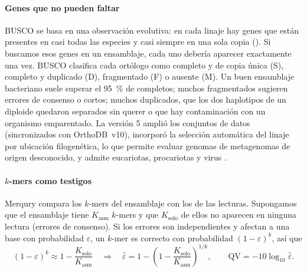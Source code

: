 \paragraph{Genes que no pueden faltar} BUSCO \parencite{c08-simao2015} se basa en una observación evolutiva: en cada linaje hay genes que están presentes en casi todas las especies y casi siempre en una sola copia (). Si buscamos esos genes en un ensamblaje, cada uno debería aparecer exactamente una vez. BUSCO clasifica cada ortólogo como completo y de copia única (S), completo y duplicado (D), fragmentado (F) o ausente (M). Un buen ensamblaje bacteriano suele superar el \SI{95}{\percent} de completos; muchos fragmentados sugieren errores de consenso o  cortos; muchos duplicados, que los dos haplotipos de un diploide quedaron separados sin querer o que hay contaminación con un organismo emparentado. La versión 5 amplió los conjuntos de datos (sincronizados con OrthoDB~v10), incorporó la selección automática del linaje por ubicación filogenética, lo que permite evaluar genomas de metagenomas de origen desconocido, y admite eucariotas, procariotas y virus \parencite{c08-manni2021}.

\paragraph{$k$-mers como testigos} Merqury \parencite{c08-rhie2020} compara los $k$-mers del ensamblaje con los de las lecturas. Supongamos que el ensamblaje tiene $K_{\text{asm}}$ $k$-mers y que $K_{\text{solo}}$ de ellos no aparecen en ninguna lectura (errores de consenso). Si los errores son independientes y afectan a una base con probabilidad $\varepsilon$, un $k$-mer es correcto con probabilidad $(1-\varepsilon)^k$, así que
\begin{equation}\label{eq:08-qv}
(1-\varepsilon)^k \approx 1-\frac{K_{\text{solo}}}{K_{\text{asm}}}
\quad\Longrightarrow\quad
\widehat{\varepsilon} = 1-\left(1-\frac{K_{\text{solo}}}{K_{\text{asm}}}\right)^{1/k},
\qquad
\mathrm{QV} = -10\log_{10}\widehat{\varepsilon}.
\end{equation}

\begin{simbolos}
\end{simbolos}

